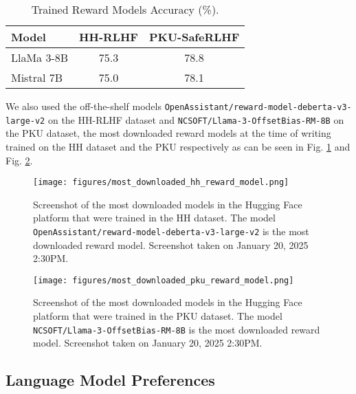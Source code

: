 \documentclass{article}
\begin{document}
\begin{table}[h!]
\centering
\caption{Trained Reward Models Accuracy (\%).}
\label{tab:acc_rms}
\small 
\setlength{\tabcolsep}{4pt}
\renewcommand{\arraystretch}{1.0}
\begin{tabular}{lcc}
\toprule
\textbf{Model}     & \textbf{HH-RLHF}      & \textbf{PKU-SafeRLHF} \\ \midrule
LlaMa 3-8B              & 75.3           & 78.8      \\
Mistral 7B         & 75.0    &  78.1         \\ \bottomrule
\end{tabular}
\end{table}


We also used the off-the-shelf models \texttt{OpenAssistant/reward-model-deberta-v3-large-v2} on the HH-RLHF dataset and \texttt{NCSOFT/Llama-3-OffsetBias-RM-8B} on the PKU dataset, the most downloaded reward models at the time of writing trained on the HH dataset and the PKU respectively as can be seen in Fig. \ref{fig:MostDownloadedhh} and Fig. \ref{fig:MostDownloadedpku}.



\begin{figure}[b]
    \centering
        \texttt{[image: figures/most\_downloaded\_hh\_reward\_model.png]}
        \caption{Screenshot of the most downloaded models in the Hugging Face platform that were trained in the HH dataset. The model \texttt{OpenAssistant/reward-model-deberta-v3-large-v2} is the most downloaded reward model. Screenshot taken on January 20, 2025 2:30PM.}
        \label{fig:MostDownloadedhh}
\end{figure}

\begin{figure}[t]
    \centering
    \texttt{[image: figures/most\_downloaded\_pku\_reward\_model.png]}
    \caption{Screenshot of the most downloaded models in the Hugging Face platform that were trained in the PKU dataset. The model \texttt{NCSOFT/Llama-3-OffsetBias-RM-8B} is the most downloaded reward model. Screenshot taken on January 20, 2025 2:30PM.}
    \label{fig:MostDownloadedpku}
        
\end{figure}


\subsection{Language Model Preferences}\label{sec:LLMPreferences}
\end{document}
